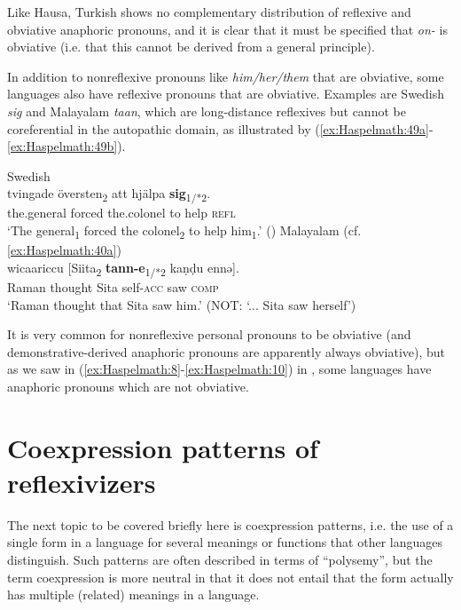 \documentclass[output=paper]{langscibook}
\begin{document}
Like Hausa, Turkish shows no complementary distribution of reflexive and obviative anaphoric pronouns, and it is clear that it must be specified that \textit{on-} is obviative (i.e. that this cannot be derived from a general principle).

In addition to nonreflexive pronouns like \textit{him/her/them} that are obviative, some languages also have reflexive pronouns that are obviative. Examples are Swedish \textit{sig} and Malayalam \textit{taan}, which are long-distance reflexives but cannot be coreferential in the autopathic domain, as illustrated by (\ref{ex:Haspelmath:49a}-\ref{ex:Haspelmath:49b}).

\ea%
    \label{ex:Haspelmath:49}
    \ea  Swedish\label{ex:Haspelmath:49a}\\
      {tvingade}  {översten\textsubscript{2}}  {att}  {hjälpa}  \textbf{{sig}}{\textsubscript{1/*2}}.\\
       the.general  forced  the.colonel  to  help  \textsc{refl} \\
    \glt‘The general\textsubscript{1} forced the colonel\textsubscript{2} to help him\textsubscript{1}.’ (\citealt[26]{Kiparsky2002})
    \ex Malayalam \label{ex:Haspelmath:49b}(cf. \ref{ex:Haspelmath:40a})\\
      {wicaariccu}  [{Siita\textsubscript{2}}  \textbf{{tann-e}}{\textsubscript{1/*2}}  {kaṇḍu}  {ennə}].\\
     Raman  thought  Sita  self-\textsc{acc}  saw  \textsc{comp}\\
     \glt  ‘Raman thought that Sita saw him.’ (NOT: ‘... Sita saw herself’)
      \citep[129]{Jayaseelan2000} 
    \z
\z 

It is very common for nonreflexive personal pronouns to be obviative (and demonstrative-derived anaphoric pronouns are apparently always obviative), but as we saw in (\ref{ex:Haspelmath:8}-\ref{ex:Haspelmath:10}) in , some languages have anaphoric pronouns which are not obviative.


\section{Coexpression patterns of reflexivizers}\label{sec:Haspelmath:11}
The next topic to be covered briefly here is coexpression patterns, i.e. the use of a single form in a language for several meanings or functions that other languages distinguish. Such patterns are often described in terms of “polysemy”, but the term {coexpression} is more neutral in that it does not entail that the form actually has multiple (related) meanings in a language.
\end{document}
